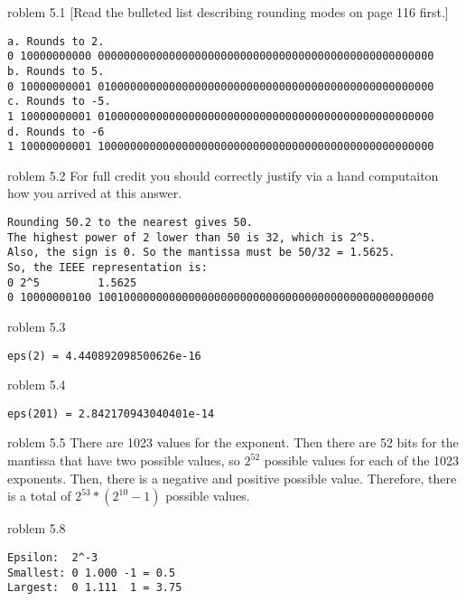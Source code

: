\documentclass[12pt]{article}
\makeatletter
\theoremstyle{homework}
\newenvironment{exercise}[1]
{\def\@currentlabel{#1}\exercisecore}
{\endexercisecore}
\makeatother
\begin{document}
\begin{exercise} Problem 5.1 [Read the bulleted list describing rounding modes on page 116 first.]
\end{exercise}
\begin{verbatim}
a. Rounds to 2.
0 10000000000 0000000000000000000000000000000000000000000000000000
b. Rounds to 5.
0 10000000001 0100000000000000000000000000000000000000000000000000 
c. Rounds to -5.
1 10000000001 0100000000000000000000000000000000000000000000000000
d. Rounds to -6
1 10000000001 1000000000000000000000000000000000000000000000000000
\end{verbatim}

\begin{exercise} Problem 5.2  For full credit you should correctly justify via a hand computaiton how you arrived at this answer.
\end{exercise}
\begin{verbatim}
Rounding 50.2 to the nearest gives 50.
The highest power of 2 lower than 50 is 32, which is 2^5.
Also, the sign is 0. So the mantissa must be 50/32 = 1.5625.
So, the IEEE representation is:
0 2^5         1.5625
0 10000000100 1001000000000000000000000000000000000000000000000000 
\end{verbatim}

\begin{exercise} Problem 5.3 
\end{exercise}
\begin{verbatim}
eps(2) = 4.440892098500626e-16
\end{verbatim}

\begin{exercise} Problem 5.4
\end{exercise}
\begin{verbatim}
eps(201) = 2.842170943040401e-14
\end{verbatim}

\begin{exercise} Problem 5.5
\end{exercise}
There are 1023 values for the exponent. Then there are 52 bits
for the mantissa that have two possible values, so $2^{52}$ possible
values for each of the 1023 exponents. Then, there is a negative 
and positive possible value. Therefore, there is a total of $2^{53}*(2^{10}-1)$ 
possible values.

\begin{exercise} Problem 5.8
\end{exercise}
\begin{verbatim}
Epsilon:  2^-3
Smallest: 0 1.000 -1 = 0.5
Largest:  0 1.111  1 = 3.75
\end{verbatim}
\end{document}
